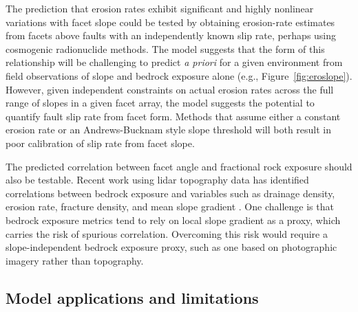 The prediction that erosion rates exhibit significant and highly nonlinear variations with facet slope could be tested by obtaining erosion-rate estimates from facets above faults with an independently known slip rate, perhaps using cosmogenic radionuclide methods. The model suggests that the form of this relationship will be challenging to predict \textit{a priori} for a given environment from field observations of slope and bedrock exposure alone (e.g., Figure~\ref{fig:eroslope}). However, given independent constraints on actual erosion rates across the full range of slopes in a given facet array, the model suggests the potential to quantify fault slip rate from facet form. Methods that assume either a constant erosion rate or an Andrews-Bucknam style slope threshold will both result in poor calibration of slip rate from facet slope. %

The predicted correlation between facet angle and fractional rock exposure should also be testable. Recent work using lidar topography data has identified correlations between bedrock exposure and variables such as drainage density, erosion rate, fracture density, and mean slope gradient  \citep{dibiase2012hillslope,dibiase2018fracture,rossi2020orographic}. One challenge is that bedrock exposure metrics tend to rely on local slope gradient as a proxy, which carries the risk of spurious correlation. Overcoming this risk would require a slope-independent bedrock exposure proxy, such as one based on photographic imagery rather than topography.



\subsection{Model applications and limitations}

